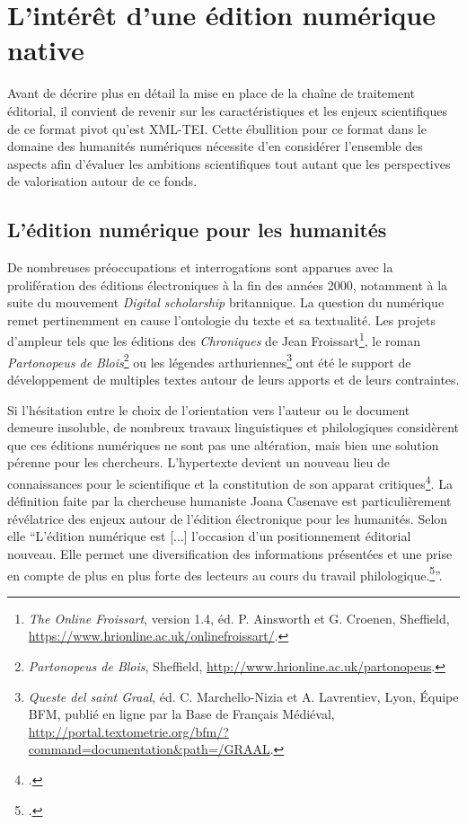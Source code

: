 	\section{L’intérêt d’une édition numérique native}
	
	Avant de décrire plus en détail la mise en place de la chaîne de traitement éditorial, il convient de revenir sur les caractéristiques et les enjeux scientifiques de ce format pivot qu'est XML-TEI. Cette ébullition pour ce format dans le domaine des humanités numériques nécessite d'en considérer l'ensemble des aspects afin d'évaluer les ambitions scientifiques tout autant que les perspectives de valorisation autour de ce fonds.
	
	\subsection{L'édition numérique pour les humanités}
	
	De nombreuses préoccupations et interrogations sont apparues avec la prolifération des éditions électroniques à la fin des années 2000, notamment à la suite du mouvement \textit{Digital scholarship} britannique. La question du numérique remet pertinemment en cause l'ontologie du texte et sa textualité. Les projets d'ampleur tels que les éditions des \textit{Chroniques} de Jean Froissart\footnote{\textit{The Online Froissart}, version 1.4, éd. P. Ainsworth et G. Croenen, Sheffield, \url{https://www.hrionline.ac.uk/onlinefroissart/}.}, le roman \textit{Partonopeus de Blois}\footnote{\textit{Partonopeus de Blois}, Sheffield, \url{http://www.hrionline.ac.uk/partonopeus}.} ou les légendes arthuriennes\footnote{\textit{Queste del saint Graal}, éd. C. Marchello-Nizia et A. Lavrentiev, Lyon, Équipe BFM, publié en ligne par la Base de Français Médiéval, \url{http://portal.textometrie.org/bfm/?command=documentation&path=/GRAAL}.} ont été le support de développement de multiples textes autour de leurs apports et de leurs contraintes.
	
	Si l'hésitation entre le choix de l'orientation vers l'auteur ou le document demeure insoluble, de nombreux travaux linguistiques et philologiques considèrent que ces éditions numériques ne sont pas une altération, mais bien une solution pérenne pour les chercheurs. L'hypertexte devient un nouveau lieu de connaissances pour le scientifique et la constitution de son apparat critiques\footcite{duvalPourEditionsNumeriques2017}. La définition faite par la chercheuse humaniste Joana Casenave est particulièrement révélatrice des enjeux autour de l'édition électronique pour les humanités. Selon elle \enquote{L’édition numérique est [...] l’occasion d’un positionnement éditorial nouveau. Elle permet une diversification des informations présentées et une prise en compte de plus en plus forte des lecteurs au cours du travail philologique.\footcite{casenavePositionnementEditorialDans2019}}.
	
